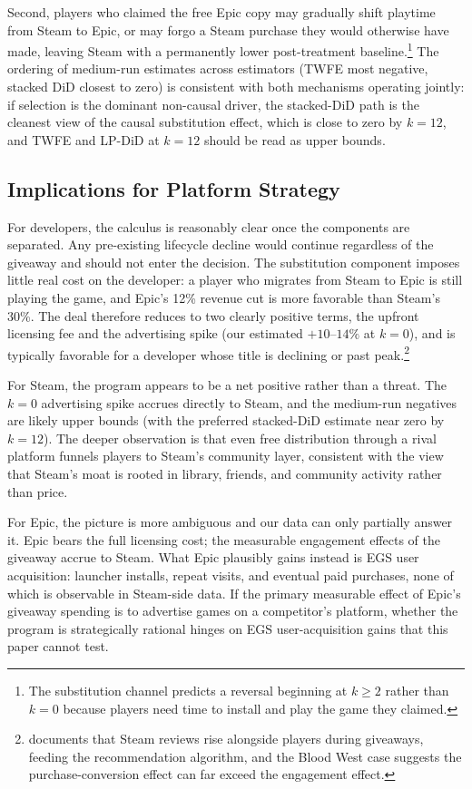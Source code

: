 \documentclass[11pt]{article}
\begin{document}
Second, players who claimed the free Epic copy may gradually shift playtime
from Steam to Epic, or may forgo a Steam purchase they would otherwise have
made, leaving Steam with a permanently lower post-treatment
baseline.\footnote{The substitution channel predicts a reversal beginning at
$k \geq 2$ rather than $k = 0$ because players need time to install and play
the game they claimed.} The ordering of medium-run estimates across
estimators (TWFE most negative, stacked DiD closest to zero) is consistent with both
mechanisms operating jointly: if selection is the dominant non-causal driver,
the stacked-DiD path is the cleanest view of the causal substitution effect,
which is close to zero by $k = 12$, and TWFE and LP-DiD at $k = 12$ should be
read as upper bounds.

\subsection{Implications for Platform Strategy}

For developers, the calculus is reasonably clear once the components are
separated. Any pre-existing lifecycle decline would continue regardless of the
giveaway and should not enter the decision. The substitution component imposes
little real cost on the developer: a player who migrates from Steam to Epic is
still playing the game, and Epic's 12\% revenue cut is more favorable than
Steam's 30\%. The deal therefore reduces to two clearly positive terms, the
upfront licensing fee and the advertising spike (our estimated $+10$--$14\%$
at $k = 0$), and is typically favorable for a developer whose title is
declining or past peak.\footnote{\citet{clarkson2025} documents that Steam
reviews rise alongside players during giveaways, feeding the recommendation
algorithm, and the Blood West case \citep{frvr2026} suggests the
purchase-conversion effect can far exceed the engagement effect.}

For Steam, the program appears to be a net positive rather than a threat. The
$k = 0$ advertising spike accrues directly to Steam, and the medium-run
negatives are likely upper bounds (with the preferred stacked-DiD estimate near
zero by $k = 12$). The deeper observation is that even free distribution
through a rival platform funnels players to Steam's community layer, consistent
with the view that Steam's moat is rooted in library, friends, and community
activity rather than price.

For Epic, the picture is more ambiguous and our data can only partially answer
it. Epic bears the full licensing cost; the measurable engagement effects of
the giveaway accrue to Steam. What Epic plausibly gains instead is EGS user
acquisition: launcher installs, repeat visits, and eventual paid purchases,
none of which is observable in Steam-side data. If the primary measurable
effect of Epic's giveaway spending is to advertise games on a competitor's
platform, whether the program is strategically rational hinges on EGS
user-acquisition gains that this paper cannot test.
\end{document}
